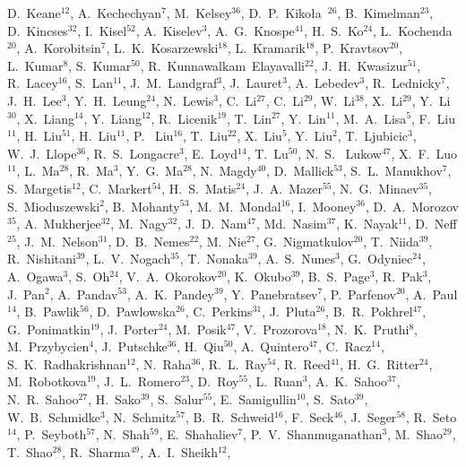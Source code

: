 {D.~Keane$^{12}$,
A.~Kechechyan$^{7}$,
M.~Kelsey$^{36}$,
D.~P.~Kiko\l{}a~$^{26}$,
B.~Kimelman$^{23}$,
D.~Kincses$^{32}$,
I.~Kisel$^{52}$,
A.~Kiselev$^{3}$,
A.~G.~Knospe$^{41}$,
H.~S.~Ko$^{24}$,
L.~Kochenda$^{20}$,
A.~Korobitsin$^{7}$,
L.~K.~Kosarzewski$^{18}$,
L.~Kramarik$^{18}$,
P.~Kravtsov$^{20}$,
L.~Kumar$^{8}$,
S.~Kumar$^{50}$,
R.~Kunnawalkam~Elayavalli$^{22}$,
J.~H.~Kwasizur$^{51}$,
R.~Lacey$^{16}$,
S.~Lan$^{11}$,
J.~M.~Landgraf$^{3}$,
J.~Lauret$^{3}$,
A.~Lebedev$^{3}$,
R.~Lednicky$^{7}$,
J.~H.~Lee$^{3}$,
Y.~H.~Leung$^{24}$,
N.~Lewis$^{3}$,
C.~Li$^{27}$,
C.~Li$^{29}$,
W.~Li$^{38}$,
X.~Li$^{29}$,
Y.~Li$^{30}$,
X.~Liang$^{14}$,
Y.~Liang$^{12}$,
R.~Licenik$^{19}$,
T.~Lin$^{27}$,
Y.~Lin$^{11}$,
M.~A.~Lisa$^{5}$,
F.~Liu$^{11}$,
H.~Liu$^{51}$,
H.~Liu$^{11}$,
P.~ Liu$^{16}$,
T.~Liu$^{22}$,
X.~Liu$^{5}$,
Y.~Liu$^{2}$,
T.~Ljubicic$^{3}$,
W.~J.~Llope$^{36}$,
R.~S.~Longacre$^{3}$,
E.~Loyd$^{14}$,
T.~Lu$^{50}$,
N.~S.~ Lukow$^{47}$,
X.~F.~Luo$^{11}$,
L.~Ma$^{28}$,
R.~Ma$^{3}$,
Y.~G.~Ma$^{28}$,
N.~Magdy$^{40}$,
D.~Mallick$^{53}$,
S.~L.~Manukhov$^{7}$,
S.~Margetis$^{12}$,
C.~Markert$^{54}$,
H.~S.~Matis$^{24}$,
J.~A.~Mazer$^{55}$,
N.~G.~Minaev$^{35}$,
S.~Mioduszewski$^{2}$,
B.~Mohanty$^{53}$,
M.~M.~Mondal$^{16}$,
I.~Mooney$^{36}$,
D.~A.~Morozov$^{35}$,
A.~Mukherjee$^{32}$,
M.~Nagy$^{32}$,
J.~D.~Nam$^{47}$,
Md.~Nasim$^{37}$,
K.~Nayak$^{11}$,
D.~Neff$^{25}$,
J.~M.~Nelson$^{31}$,
D.~B.~Nemes$^{22}$,
M.~Nie$^{27}$,
G.~Nigmatkulov$^{20}$,
T.~Niida$^{39}$,
R.~Nishitani$^{39}$,
L.~V.~Nogach$^{35}$,
T.~Nonaka$^{39}$,
A.~S.~Nunes$^{3}$,
G.~Odyniec$^{24}$,
A.~Ogawa$^{3}$,
S.~Oh$^{24}$,
V.~A.~Okorokov$^{20}$,
K.~Okubo$^{39}$,
B.~S.~Page$^{3}$,
R.~Pak$^{3}$,
J.~Pan$^{2}$,
A.~Pandav$^{53}$,
A.~K.~Pandey$^{39}$,
Y.~Panebratsev$^{7}$,
P.~Parfenov$^{20}$,
A.~Paul$^{14}$,
B.~Pawlik$^{56}$,
D.~Pawlowska$^{26}$,
C.~Perkins$^{31}$,
J.~Pluta$^{26}$,
B.~R.~Pokhrel$^{47}$,
G.~Ponimatkin$^{19}$,
J.~Porter$^{24}$,
M.~Posik$^{47}$,
V.~Prozorova$^{18}$,
N.~K.~Pruthi$^{8}$,
M.~Przybycien$^{4}$,
J.~Putschke$^{36}$,
H.~Qiu$^{50}$,
A.~Quintero$^{47}$,
C.~Racz$^{14}$,
S.~K.~Radhakrishnan$^{12}$,
N.~Raha$^{36}$,
R.~L.~Ray$^{54}$,
R.~Reed$^{41}$,
H.~G.~Ritter$^{24}$,
M.~Robotkova$^{19}$,
J.~L.~Romero$^{23}$,
D.~Roy$^{55}$,
L.~Ruan$^{3}$,
A.~K.~Sahoo$^{37}$,
N.~R.~Sahoo$^{27}$,
H.~Sako$^{39}$,
S.~Salur$^{55}$,
E.~Samigullin$^{10}$,
S.~Sato$^{39}$,
W.~B.~Schmidke$^{3}$,
N.~Schmitz$^{57}$,
B.~R.~Schweid$^{16}$,
F.~Seck$^{46}$,
J.~Seger$^{58}$,
R.~Seto$^{14}$,
P.~Seyboth$^{57}$,
N.~Shah$^{59}$,
E.~Shahaliev$^{7}$,
P.~V.~Shanmuganathan$^{3}$,
M.~Shao$^{29}$,
T.~Shao$^{28}$,
R.~Sharma$^{49}$,
A.~I.~Sheikh$^{12}$,
}
